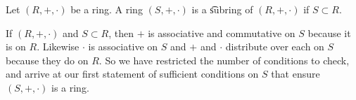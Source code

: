 
Let $(R, +, \cdot )$ be a ring.
A ring $(S, +, \cdot )$ is a \t{subring} of $(R, +, \cdot )$ if $S \subset R$.

If $(R, +, \cdot )$ and $S \subset R$, then $+$ is associative and commutative on $S$ because it is on $R$. Likewise $\cdot $ is associative on $S$ and $+$ and $\cdot $ distribute over each on $S$ because they do on $R$.
So we have restricted the number of conditions to check, and arrive at our first statement of sufficient conditions on $S$ that ensure $(S, +, \cdot )$ is a ring.

\blankpage
